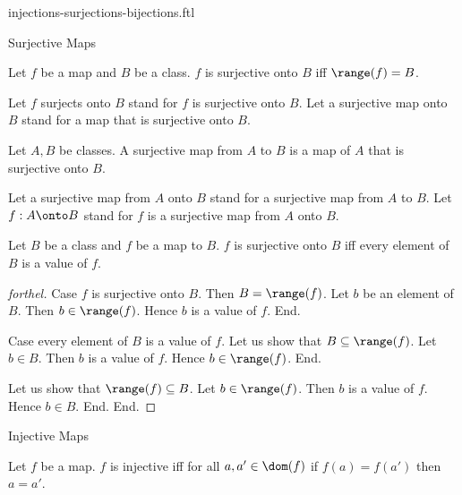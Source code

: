 \documentclass{naproche-library}
\begin{document}
\begin{smodule}[title={Injective, Surjective and Bijective Maps}]{injections-surjections-bijections.ftl}

\begin{sfragment}{Surjective Maps}
  \begin{definition}[forthel,id=FOUNDATIONS_08_8681187805495296]
    Let $f$ be a map and $B$ be a class.
    $f$ is surjective onto $B$ iff $\range(f) = B$.

    Let $f$ surjects onto $B$ stand for $f$ is surjective onto $B$.
    Let a surjective map onto $B$ stand for a map that is surjective onto $B$.
  \end{definition}

  \begin{definition}[forthel,id=FOUNDATIONS_08_4195237329108992]
    Let $A, B$ be classes.
    A surjective map from $A$ to $B$ is a map of $A$ that is surjective onto $B$.

    Let a surjective map from $A$ onto $B$ stand for a surjective map from $A$ to $B$.
    Let $f: A \onto B$ stand for $f$ is a surjective map from $A$ onto $B$.
  \end{definition}

  \begin{proposition}[forthel,id=FOUNDATIONS_08_1974205941809152]
    Let $B$ be a class and $f$ be a map to $B$.
    $f$ is surjective onto $B$ iff every element of $B$ is a value of $f$.
  \end{proposition}
  \begin{proof}[forthel]
    Case $f$ is surjective onto $B$.
      Then $B = \range(f)$.
      Let $b$ be an element of $B$.
      Then $b \in \range(f)$.
      Hence $b$ is a value of $f$.
    End.

    Case every element of $B$ is a value of $f$.
      Let us show that $B \subseteq \range(f)$.
        Let $b \in B$.
        Then $b$ is a value of $f$.
        Hence $b \in \range(f)$.
      End.

      Let us show that $\range(f) \subseteq B$.
        Let $b \in \range(f)$.
        Then $b$ is a value of $f$.
        Hence $b \in B$.
      End.
    End.
  \end{proof}
\end{sfragment}

\begin{sfragment}{Injective Maps}
  \begin{definition}[forthel,id=FOUNDATIONS_08_605931408719872]
    Let $f$ be a map.
    $f$ is injective iff for all $a, a' \in \dom(f)$ if $f(a) = f(a')$ then $a = a'$.


\end{definition}
\end{sfragment}
\end{smodule}
\end{document}
